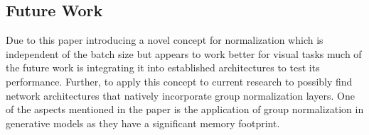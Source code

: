 \subsection{Future Work}
Due to this paper introducing a novel concept for normalization which is independent of the batch size but appears to work better for visual tasks much of the future work is integrating it into established architectures to test its performance.
Further, to apply this concept to current research to possibly find network architectures that natively incorporate group normalization layers.
One of the aspects mentioned in the paper is the application of group normalization in generative models as they have a significant memory footprint.